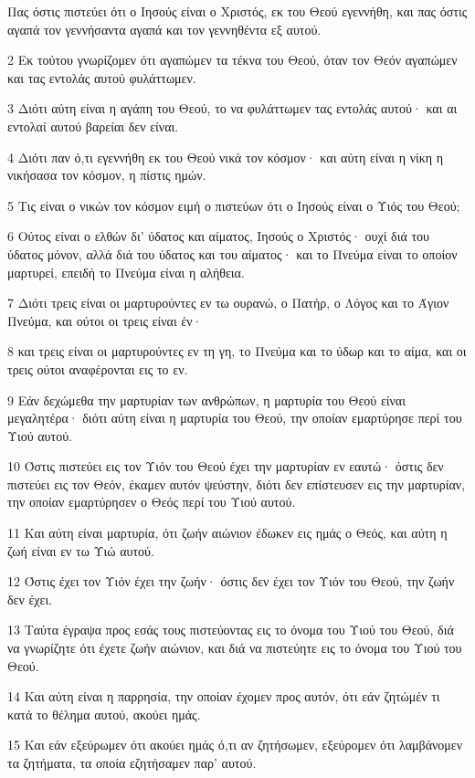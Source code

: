 \par Πας όστις πιστεύει ότι ο Ιησούς είναι ο Χριστός, εκ του Θεού εγεννήθη, και πας όστις αγαπά τον γεννήσαντα αγαπά και τον γεννηθέντα εξ αυτού.
\par 2 Εκ τούτου γνωρίζομεν ότι αγαπώμεν τα τέκνα του Θεού, όταν τον Θεόν αγαπώμεν και τας εντολάς αυτού φυλάττωμεν.
\par 3 Διότι αύτη είναι η αγάπη του Θεού, το να φυλάττωμεν τας εντολάς αυτού· και αι εντολαί αυτού βαρείαι δεν είναι.
\par 4 Διότι παν ό,τι εγεννήθη εκ του Θεού νικά τον κόσμον· και αύτη είναι η νίκη η νικήσασα τον κόσμον, η πίστις ημών.
\par 5 Τις είναι ο νικών τον κόσμον ειμή ο πιστεύων ότι ο Ιησούς είναι ο Υιός του Θεού;
\par 6 Ούτος είναι ο ελθών δι' ύδατος και αίματος, Ιησούς ο Χριστός· ουχί διά του ύδατος μόνον, αλλά διά του ύδατος και του αίματος· και το Πνεύμα είναι το οποίον μαρτυρεί, επειδή το Πνεύμα είναι η αλήθεια.
\par 7 Διότι τρεις είναι οι μαρτυρούντες εν τω ουρανώ, ο Πατήρ, ο Λόγος και το Άγιον Πνεύμα, και ούτοι οι τρεις είναι έν·
\par 8 και τρεις είναι οι μαρτυρούντες εν τη γη, το Πνεύμα και το ύδωρ και το αίμα, και οι τρεις ούτοι αναφέρονται εις το εν.
\par 9 Εάν δεχώμεθα την μαρτυρίαν των ανθρώπων, η μαρτυρία του Θεού είναι μεγαλητέρα· διότι αύτη είναι η μαρτυρία του Θεού, την οποίαν εμαρτύρησε περί του Υιού αυτού.
\par 10 Όστις πιστεύει εις τον Υιόν του Θεού έχει την μαρτυρίαν εν εαυτώ· όστις δεν πιστεύει εις τον Θεόν, έκαμεν αυτόν ψεύστην, διότι δεν επίστευσεν εις την μαρτυρίαν, την οποίαν εμαρτύρησεν ο Θεός περί του Υιού αυτού.
\par 11 Και αύτη είναι μαρτυρία, ότι ζωήν αιώνιον έδωκεν εις ημάς ο Θεός, και αύτη η ζωή είναι εν τω Υιώ αυτού.
\par 12 Όστις έχει τον Υιόν έχει την ζωήν· όστις δεν έχει τον Υιόν του Θεού, την ζωήν δεν έχει.
\par 13 Ταύτα έγραψα προς εσάς τους πιστεύοντας εις το όνομα του Υιού του Θεού, διά να γνωρίζητε ότι έχετε ζωήν αιώνιον, και διά να πιστεύητε εις το όνομα του Υιού του Θεού.
\par 14 Και αύτη είναι η παρρησία, την οποίαν έχομεν προς αυτόν, ότι εάν ζητώμέν τι κατά το θέλημα αυτού, ακούει ημάς.
\par 15 Και εάν εξεύρωμεν ότι ακούει ημάς ό,τι αν ζητήσωμεν, εξεύρομεν ότι λαμβάνομεν τα ζητήματα, τα οποία εζητήσαμεν παρ' αυτού.
